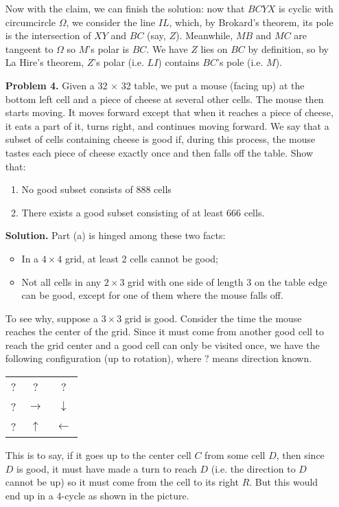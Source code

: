 \documentclass[11pt,a4paper]{article}
\begin{document}
\begin{enumerate}
	Now with the claim, we can finish the solution: now that $BCYX$ is cyclic with circumcircle $\Omega$, we consider the line $IL$, which, by Brokard's theorem, its pole is the intersection of $XY$ and $BC$ (say, $Z$). Meanwhile, $MB$ and $MC$ are tangeent to $\Omega$ so $M$'s polar is $BC$. We have $Z$ lies on $BC$ by definition, so by La Hire's theorem, $Z$'s polar (i.e. $LI$) contains $BC$'s pole (i.e. $M$). 
	
	\item[\textbf{Problem 4.}]
	Given a 32 $\times$ 32 table, we put a mouse (facing up) at the bottom left
	cell and a piece of cheese at several other cells. The mouse then starts moving. It
	moves forward except that when it reaches a piece of cheese, it eats a part of it, turns
	right, and continues moving forward. We say that a subset of cells containing cheese
	is good if, during this process, the mouse tastes each piece of cheese exactly once and
	then falls off the table. Show that:
	
	\begin{enumerate}
		\item No good subset consists of 888 cells
		
		\item There exists a good subset consisting of at least 666 cells. 
	\end{enumerate}
    
    \textbf{Solution.}
    Part (a) is hinged among these two facts: 
    \begin{itemize}
    	\item In a $4\times 4$ grid, at least 2 cells cannot be good; 
    	
    	\item Not all cells in any $2\times 3$ grid with one side of length 3 on the table edge can be good, 
    	except for one of them where the mouse falls off. 
    \end{itemize}
    
    To see why, suppose a $3\times 3$ grid is good. 
    Consider the time the mouse reaches the center of the grid. 
    Since it must come from another good cell to reach the grid center and a good cell can only be visited once, we have the following configuration (up to rotation), where $?$ means direction known. 
    \begin{table}[H]
    	\begin{center}
    		\begin{tabular}{ccc}
    			? & ? & ?\\
    			? & $\rightarrow$ & $\downarrow$\\
    			? & $\uparrow$ & $\leftarrow$\\
    		\end{tabular}
    	\end{center}
    \end{table}
    This is to say, if it goes up to the center cell $C$ from some cell $D$, then 
    since $D$ is good, it must have made a turn to reach $D$ (i.e. the direction to $D$ cannot be up)
    so it must come from the cell to its right $R$. 
    But this would end up in a 4-cycle as shown in the picture. 
    

\end{enumerate}
\end{document}
